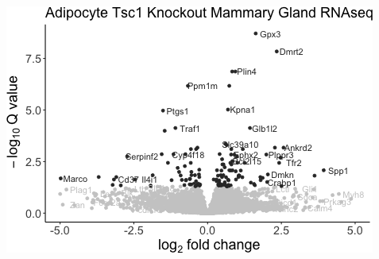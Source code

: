 \documentclass[]{article}
\begin{document}
\includegraphics{figures-noura/volcano-plot-1.png}
\end{document}
